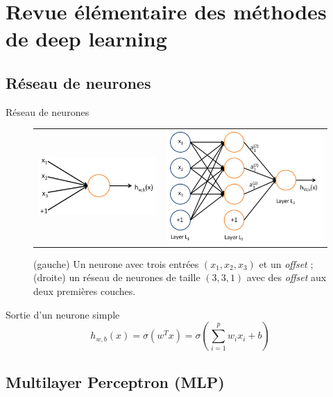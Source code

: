 \section{Revue élémentaire des méthodes de deep learning}

\subsection{Réseau de neurones}

\begin{frame}{Réseau de neurones}
\begin{figure}[ht!]
\centering
\begin{tabular}{cc}
\includegraphics[width = .4\columnwidth]{../fig/SingleNeuron.png} &
\includegraphics[width = .4\columnwidth]{../fig/Network331.png} 
\end{tabular}
\caption{(gauche) Un neurone avec trois entrées $(x_1,x_2,x_3)$ et un \emph{offset} ; (droite) un réseau de neurones de taille $(3,3,1)$ avec des \emph{offset} aux deux premières couches.}
\label{fig1}
\end{figure}
\begin{block}{Sortie d'un neurone simple}
\begin{equation}
h_{w,b}(x)=\sigma(w^Tx)=\sigma\left(\sum_{i=1}^p w_i x_i + b\right)
\end{equation}
\end{block}
\end{frame}



\subsection{Multilayer Perceptron (MLP)}

